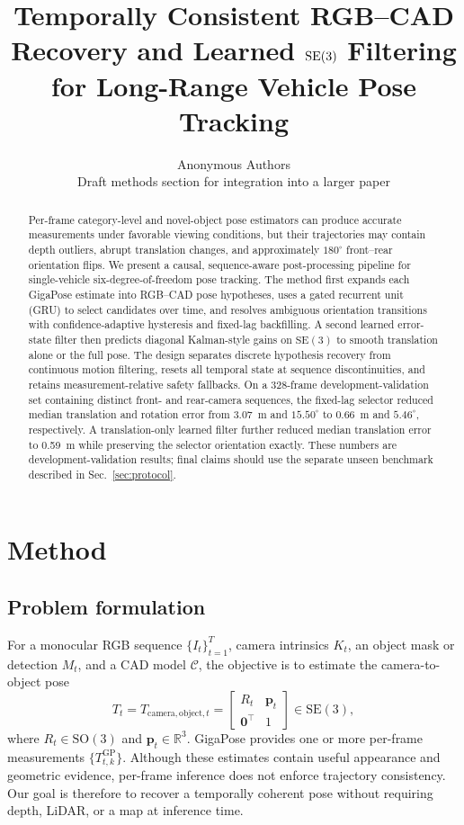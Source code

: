 \documentclass[10pt,twocolumn]{article}
\title{Temporally Consistent RGB--CAD Recovery and Learned $\SE$ Filtering for Long-Range Vehicle Pose Tracking}
\author{Anonymous Authors\\
\small Draft methods section for integration into a larger paper}
\date{}
\newcommand{\SE}{\mathrm{SE}(3)}
\newcommand{\SO}{\mathrm{SO}(3)}
\newcommand{\R}{\mathbb{R}}
\begin{document}
\maketitle

\begin{abstract}
Per-frame category-level and novel-object pose estimators can produce accurate
measurements under favorable viewing conditions, but their trajectories may
contain depth outliers, abrupt translation changes, and approximately
$180^\circ$ front--rear orientation flips. We present a causal, sequence-aware
post-processing pipeline for single-vehicle six-degree-of-freedom pose
tracking. The method first expands each GigaPose estimate into RGB--CAD pose
hypotheses, uses a gated recurrent unit (GRU) to select candidates over time,
and resolves ambiguous orientation transitions with confidence-adaptive
hysteresis and fixed-lag backfilling. A second learned error-state filter then
predicts diagonal Kalman-style gains on $\SE$ to smooth translation alone or
the full pose. The design separates discrete hypothesis recovery from
continuous motion filtering, resets all temporal state at sequence
discontinuities, and retains measurement-relative safety fallbacks. On a
328-frame development-validation set containing distinct front- and
rear-camera sequences, the fixed-lag selector reduced median translation and
rotation error from 3.07~m and $15.50^\circ$ to 0.66~m and $5.46^\circ$,
respectively. A translation-only learned filter further reduced median
translation error to 0.59~m while preserving the selector orientation exactly.
These numbers are development-validation results; final claims should use the
separate unseen benchmark described in Sec.~\ref{sec:protocol}.
\end{abstract}

\section{Method}
\label{sec:method}

\subsection{Problem formulation}

For a monocular RGB sequence $\{I_t\}_{t=1}^{T}$, camera intrinsics $K_t$, an
object mask or detection $M_t$, and a CAD model $\mathcal{C}$, the objective is
to estimate the camera-to-object pose
\begin{equation}
    T_t = T_{\mathrm{camera},\mathrm{object},t}
    = \begin{bmatrix}R_t & \bm{p}_t\\ \bm{0}^{\top} & 1\end{bmatrix}
    \in \SE,
\end{equation}
where $R_t\in\SO$ and $\bm{p}_t\in\R^3$. GigaPose
\cite{nguyen2024gigapose} provides one or more per-frame measurements
$\{T^{\mathrm{GP}}_{t,k}\}$. Although these estimates contain useful
appearance and geometric evidence, per-frame inference does not enforce
trajectory consistency. Our goal is therefore to recover a temporally
coherent pose without requiring depth, LiDAR, or a map at inference time.
\end{document}
